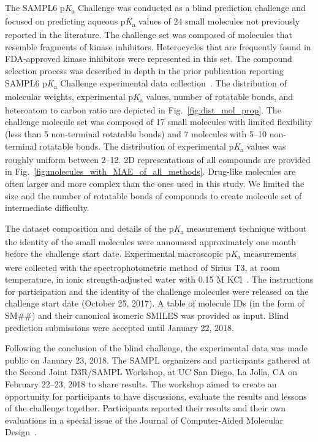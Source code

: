 \documentclass[9pt,lineno,final]{elife}
\newcommand{\pKa}{p\textit{K}\textsubscript{a}}
\begin{document}
The SAMPL6 \pKa{} Challenge was conducted as a blind prediction challenge and focused on predicting aqueous \pKa{} values of 24 small molecules not previously reported in the literature. 
The challenge set was composed of molecules that resemble fragments of kinase inhibitors. 
Heterocycles that are frequently found in FDA-approved kinase inhibitors were represented in this set. 
The compound selection process was described in depth in the prior publication reporting SAMPL6 \pKa{} Challenge experimental data collection~\citep{Isik:2018:J.Comput.AidedMol.Des.}.
The distribution of molecular weights, experimental \pKa{} values, number of rotatable bonds, and heteroatom to carbon ratio are depicted in Fig.~\ref{fig:dist_mol_prop}. 
The challenge molecule set was composed of 17 small molecules with limited flexibility (less than 5 non-terminal rotatable bonds) and 7 molecules with 5--10 non-terminal rotatable bonds. 
The distribution of experimental \pKa{} values was roughly uniform between 2--12.
2D representations of all compounds are provided in Fig.~\ref{fig:molecules_with_MAE_of_all_methods}. 
Drug-like molecules are often larger and more complex than the ones used in this study. 
We limited the size and the number of rotatable bonds of compounds to create molecule set of intermediate difficulty.

The dataset composition and details of the \pKa{} measurement technique without the identity of the small molecules were announced approximately one month before the challenge start date. 
Experimental macroscopic \pKa{} measurements were collected with the spectrophotometric method of Sirius T3, at room temperature, in ionic strength-adjusted water with 0.15 M KCl~\citep{Isik:2018:J.Comput.AidedMol.Des.}. 
The instructions for participation and the identity of the challenge molecules were released on the challenge start date (October 25, 2017). 
A table of molecule IDs (in the form of SM\#\#) and	their canonical isomeric SMILES was provided as input.
Blind prediction submissions were accepted until January 22, 2018. 

Following the conclusion of the blind challenge, the experimental data was made public on January 23, 2018. 
The SAMPL organizers and participants gathered at the Second Joint D3R/SAMPL Workshop, at UC San Diego, La Jolla, CA on February 22--23, 2018 to share results.
The workshop aimed to create an opportunity for participants to have discussions, evaluate the results and lessons of the challenge together. 
Participants reported their results and their own evaluations in a special issue of the Journal of Computer-Aided Molecular Design~\citep{JCAMD_special_issue_pKa}. 
\end{document}
